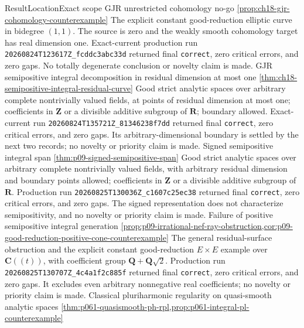 \begin{AppLProvenanceLedger}{Result}{Location}{Exact scope}
\AppLProvenanceRecord
  {GJR unrestricted cohomology no-go}
  {\cref{prop:ch18-gjr-cohomology-counterexample}}
  {The explicit constant good-reduction elliptic curve in bidegree
   \((1,1)\).  The source is zero and the weakly smooth cohomology target has
   real dimension one.  Exact-current production run
   \nolinkurl{20260824T123617Z_fcddc3abc33d} returned final
   \texttt{correct}, zero critical errors, and zero gaps.  No totally
   degenerate conclusion or novelty claim is made.}
\AppLProvenanceRecord
  {GJR semipositive integral decomposition in residual dimension at most one}
  {\cref{thm:ch18-semipositive-integral-residual-curve}}
  {Good strict analytic spaces over arbitrary complete nontrivially valued
   fields, at points of residual dimension at most one; coefficients in
   \(\mathbf Z\) or a divisible additive subgroup of \(\mathbf R\); boundary
   allowed.  Exact-current run
   \nolinkurl{20260824T135721Z_81346238f7dd} returned final
   \texttt{correct}, zero critical errors, and zero gaps.  Its
   arbitrary-dimensional boundary is settled by the next two records; no
   novelty or priority claim is made.}
\AppLProvenanceRecord
  {Signed semipositive integral span}
  {\cref{thm:p09-signed-semipositive-span}}
  {Good strict analytic spaces over arbitrary complete nontrivially valued
   fields, with arbitrary residual dimension and boundary points allowed;
   coefficients in \(\mathbf Z\) or a divisible additive subgroup of
   \(\mathbf R\).  Production run
   \nolinkurl{20260825T130036Z_c1607c25ec38} returned final
   \texttt{correct}, zero critical errors, and zero gaps.  The signed
   representation does not characterize semipositivity, and no novelty or
   priority claim is made.}
\AppLProvenanceRecord
  {Failure of positive semipositive integral generation}
  {\cref{prop:p09-irrational-nef-ray-obstruction,cor:p09-good-reduction-positive-cone-counterexample}}
  {The general residual-surface obstruction and the explicit constant
   good-reduction \(E\times E\) example over \(\mathbf C((t))\), with
   coefficient group \(\mathbf Q+\mathbf Q\sqrt2\).  Production run
   \nolinkurl{20260825T130707Z_4c4a1f2c885f} returned final
   \texttt{correct}, zero critical errors, and zero gaps.  It excludes even
   arbitrary nonnegative real coefficients; no novelty or priority claim is
   made.}
\AppLProvenanceRecord
  {Classical pluriharmonic regularity on quasi-smooth analytic spaces}
  {\cref{thm:p061-quasismooth-ph-rpl,prop:p061-integral-pl-counterexample}}

\end{AppLProvenanceLedger}
